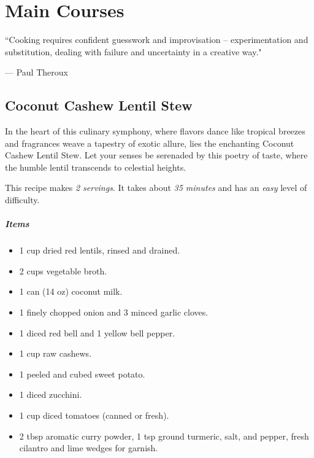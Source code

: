 \chapter{Main Courses}
\label{mains}
\epigraph{``Cooking requires confident guesswork and improvisation -- experimentation and substitution, dealing with failure and uncertainty in a creative way."}{--- \textup{Paul Theroux}}

\clearpage
\section{Coconut Cashew Lentil Stew}
\label{coconutcashewlentilstew}
In the heart of this culinary symphony, where flavors dance like tropical breezes and fragrances weave a tapestry of exotic allure, lies the enchanting Coconut Cashew Lentil Stew. Let your senses be serenaded by this poetry of taste, where the humble lentil transcends to celestial heights.

This recipe makes \emph{2 servings}. It takes about \emph{35 minutes} and has an \emph{easy} level of difficulty. 

\paragraph{Items}
\begin{itemize}[noitemsep]
	\item[\ding{182}] 1 cup dried red lentils, rinsed and drained.
	\item[\ding{183}] 2 cups vegetable broth.
	\item[\ding{184}] 1 can (14 oz) coconut milk.
	\item[\ding{185}] 1 finely chopped onion and 3 minced garlic cloves.
	\item[\ding{186}] 1 diced red bell and 1 yellow bell pepper.
	\item[\ding{187}] 1 cup raw cashews.
	\item[\ding{188}] 1 peeled and cubed sweet potato.
	\item[\ding{189}] 1 diced zucchini.
	\item[\ding{190}] 1 cup diced tomatoes (canned or fresh).
	\item[\ding{191}] 2 tbsp aromatic curry powder, 1 tsp ground turmeric, salt, and pepper, fresh cilantro and lime wedges for garnish.
\end{itemize}

